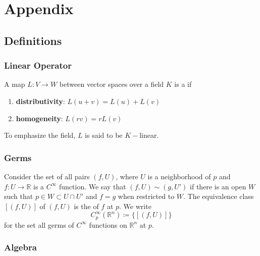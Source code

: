 \section{Appendix}\label{sec:appendix}
\localtableofcontents

\subsection{Definitions}

\subsubsection{Linear Operator}\label{subsubsec:linearoperator}

A map \(L \colon V \rightarrow W\) between vector spaces over a field \(K\) is a  if
%
\begin{enumerate}
    \item \textbf{distributivity}: \(L(u+v) = L(u) + L(v)\)
    \item \textbf{homogeneity}: \(L(rv) = r L(v)\)
\end{enumerate}
%
To emphasize the field, \(L\) is said to be \(K-\)linear.

\subsubsection{Germs}

Consider the set of all pairs \((f, U)\), where \(U\) is a neighborhood of \(p\) and \(f\colon U \rightarrow \mathbb{R}\) is a \(C^\infty\) function.
%
We say that \((f, U) \sim (g, U')\) if there is an open \(W\) such that \(p \in W \subset U \cap U'\) and \(f = g\) when restricted to \(W\).
%
The equivalence class \([(f, U)]\) of \((f, U)\) is the  of \(f\) at \(p\).
%
We write
%
\begin{equation}
    C_p^\infty(\mathbb{R}^n) \coloneqq \{[(f, U)]\}
\end{equation}
%
for the set all germs of \(C^\infty\) functions on \(\mathbb{R}^n\) at \(p\).

\subsubsection{Algebra}\label{subsubsec:algebra}

